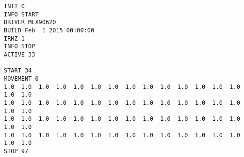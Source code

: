\begin{verbatim}
INIT 0
INFO START
DRIVER MLX90620
BUILD Feb  1 2015 00:00:00
IRHZ 1
INFO STOP
ACTIVE 33

START 34
MOVEMENT 0
1.0  1.0  1.0  1.0  1.0  1.0  1.0  1.0  1.0  1.0  1.0  1.0  1.0  1.0  1.0  1.0
1.0  1.0  1.0  1.0  1.0  1.0  1.0  1.0  1.0  1.0  1.0  1.0  1.0  1.0  1.0  1.0
1.0  1.0  1.0  1.0  1.0  1.0  1.0  1.0  1.0  1.0  1.0  1.0  1.0  1.0  1.0  1.0
1.0  1.0  1.0  1.0  1.0  1.0  1.0  1.0  1.0  1.0  1.0  1.0  1.0  1.0  1.0  1.0
STOP 97
\end{verbatim}
